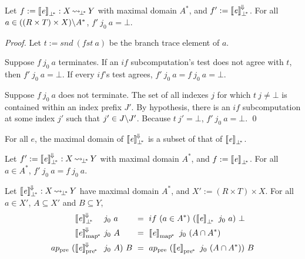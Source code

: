 \documentclass{llncs}
\newcommand{\arrow}{\rightsquigarrow}
\newcommand{\conv}{^{\mspace{-2mu}\Downarrow\mspace{-2mu}}}
\newcommand{\meaningofconv}[1]{\left\llbracket{#1}\right\rrbracket\conv}
\newcommand{\pre}{_\mathrm{pre}}
\newcommand{\pbot}{{\bot^{\mspace{-4mu}*}}}
\DeclareMathOperator{\pbotto}{\arrow_{\mspace{-3mu}\pbot}}
\newcommand{\pmap}{_\mathrm{map^{\mspace{-2mu}*}}}
\newcommand{\ppre}{_\mathrm{pre^{\mspace{-2mu}*}}}
\begin{document}
\begin{theorem}
Let $f := \meaningof{\mathit{e}}_\pbot : X \pbotto Y$ with maximal domain $A^*$, and $f' := \meaningofconv{\mathit{e}}_\pbot$.
For all $a \in ((R \times T) \times X) \backslash A^*$, $f'~j_0~a = \bot$.
\end{theorem}
\begin{proof}
Let $t := snd~(fst~a)$ be the branch trace element of $a$.

Suppose $f~j_0~a$ terminates.
If an $if$ subcomputation's test does not agree with $t$, then $f'~j_0~a = \bot$.
If every $if$'s test agrees, $f'~j_0~a = f~j_0~a = \bot$.

Suppose $f~j_0~a$ does not terminate.
The set of all indexes $j$ for which $t~j \neq \bot$ is contained within an index prefix $J'$.
By hypothesis, there is an $if$ subcomputation at some index $j'$ such that $j' \in J \backslash J'$.
Because $t~j' = \bot$, $f'~j_0~a = \bot$.
\qed
\end{proof}

\begin{corollary}
For all $\mathit{e}$, the maximal domain of $\meaningofconv{\mathit{e}}_\pbot$ is a subset of that of $\meaningof{\mathit{e}}_\pbot$.
\end{corollary}

\begin{corollary}
Let $f' := \meaningofconv{\mathit{e}}_\pbot : X \pbotto Y$ with maximal domain $A^*$, and $f := \meaningof{\mathit{e}}_\pbot$.
For all $a \in A^*$, $f'~j_0~a = f~j_0~a$.
\end{corollary}


\begin{corollary}
\label{cor:correct-convergence}
Let $\meaningofconv{\mathit{e}}_\pbot : X \pbotto Y$ have maximal domain $A^*$, and $X' := (R \times T) \times X$.
For all $a \in X'$, $A \subseteq X'$ and $B \subseteq Y$,
\begin{equation}
\begin{aligned}
	&\meaningofconv{\mathit{e}}_\pbot &&\!\!\!\!j_0~a &&\!\!\!\!= \ if~(a \in A^*)~(\meaningof{\mathit{e}}_\pbot~j_0~a)~\bot \\
	&\meaningofconv{\mathit{e}}\pmap &&\!\!\!\!j_0~A &&\!\!\!\!= \ \meaningof{\mathit{e}}\pmap~j_0~(A \i A^*) \\
	ap\pre~(\!&\meaningofconv{\mathit{e}}\ppre &&\!\!\!\!j_0~A)~B &&\!\!\!\!= \ ap\pre~(\meaningof{\mathit{e}}\ppre~j_0~(A \i A^*))~B
\end{aligned}
\end{equation}
\end{corollary}
\end{document}
